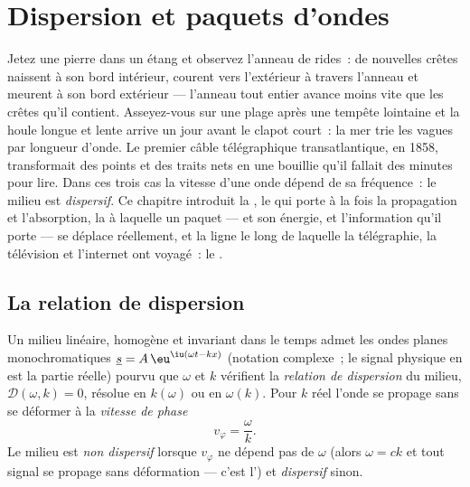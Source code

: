 \chapter{Dispersion et paquets d'ondes}\label{ch:b2:dispersion-wave-packets}

Jetez une pierre dans un étang et observez l'anneau de rides~: de nouvelles crêtes
naissent à son bord intérieur, courent vers l'extérieur à travers l'anneau et meurent à son
bord extérieur --- l'anneau tout entier avance moins vite que les crêtes qu'il contient.
Asseyez-vous sur une plage après une tempête lointaine et la houle longue et lente arrive
un jour avant le clapot court~: la mer trie les vagues par longueur d'onde. Le
premier câble télégraphique transatlantique, en 1858, transformait des points et des
traits nets en une bouillie qu'il fallait des minutes pour lire. Dans ces trois cas la
vitesse d'une onde dépend de sa fréquence~: le milieu est
\emph{dispersif}. Ce chapitre introduit la , le
 qui porte à la fois la propagation et l'absorption, la
 à laquelle un paquet --- et son énergie, et
l'information qu'il porte --- se déplace réellement, et la ligne le long de laquelle la télégraphie,
la télévision et l'internet ont voyagé~: le .

\section{La relation de dispersion}

\begin{definition}\label{def:b2:dispersion-wave-packets:relation}
Un milieu linéaire, homogène et invariant dans le temps admet les ondes planes
monochromatiques $\underline s = A\,\eu^{\iu(\omega t - kx)}$ (notation
complexe~; le signal physique en est la partie réelle) pourvu que $\omega$ et $k$
vérifient la \emph{relation de dispersion} du milieu, $\mathcal D(\omega, k)
= 0$, résolue en $k(\omega)$ ou en $\omega(k)$. Pour $k$ réel l'onde se propage
sans se déformer à la \emph{vitesse de phase}
\[
v_\varphi = \frac\omega k .
\]
Le milieu est \emph{non dispersif} lorsque $v_\varphi$ ne dépend pas de
$\omega$ (alors $\omega = ck$ et tout signal se propage sans déformation --- c'est
l') et \emph{dispersif} sinon.
\end{definition}

